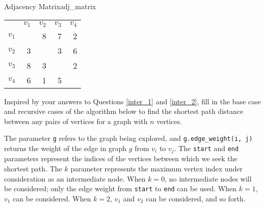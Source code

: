 \documentclass{tufte-handout}
\begin{document}
\begin{questions}

\begin{model}{Adjacency Matrix}{adj_matrix}
\begin{tabular}{ l r r r r }
      & $v_1$ & $v_2$ & $v_3$ & $v_4$ \\
$v_1$ &       & 8     & 7     & 2 \\
$v_2$ & 3     &       & 3     & 6 \\
$v_3$ & 8     & 3     &       & 2 \\
$v_4$ & 6     & 1     & 5     &   \\
\end{tabular}
\label{adj_matrix}
\end{model}

\item Inspired by your answers to Questions \ref{inter_1} and \ref{inter_2}, fill in the base case and recursive cases of the algorithm below to find the shortest path distance between any pairs of vertices for a graph with $n$ vertices. 

The parameter \verb|g| refers to the graph being explored, and \verb|g.edge_weight(i, j)| returns the weight of the edge in graph $g$ from $v_i$ to $v_j$. The \verb|start| and \verb|end| parameters represent the indices of the vertices between which we seek the shortest path. The $k$ parameter represents the maximum vertex index under consideration as an intermediate node. When $k = 0$, no intermediate nodes will be considered; only the edge weight from \verb|start| to \verb|end| can be used. When $k=1$, $v_1$ can be considered. When $k=2$, $v_1$ and $v_2$ can be considered, and so forth. \label{f-w-1}


\end{questions}
\end{document}
